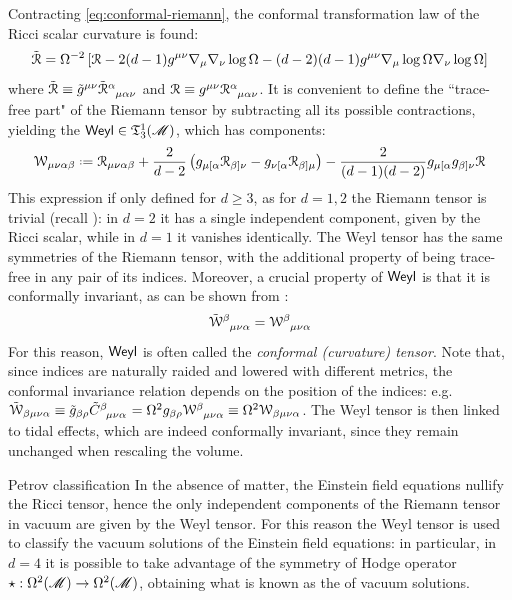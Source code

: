 Contracting \ref{eq:conformal-riemann}, the conformal transformation law of the Ricci scalar curvature is found:
\begin{equation}
  \tilde{\EuScript{R}} = \Omega^{-2} \left[ \EuScript{R} - 2 (d-1) g^{\mu \nu} \nabla_\mu \nabla_\nu \log \Omega - (d-2)(d-1) g^{\mu \nu} \nabla_\mu \log \Omega \nabla_\nu \log \Omega \right]
  \label{eq:conforma-ricci-scalar}
\end{equation}
where $ \tilde{\rr} \equiv \tilde{g}^{\mu \nu} \tensor{\tilde{\rr}}{^\alpha_{\mu \alpha \nu}} $ and $ \rr \equiv g^{\mu \nu} \tensor{\rr}{^\alpha_{\mu \alpha \nu}} $. It is convenient to define the ``trace-free part" of the Riemann tensor by subtracting all its possible contractions, yielding the  $ \textsf{Weyl} \in \mathfrak{T}^{1}_{3}(\mathscr{M}) $, which has components:
\begin{equation}
  \ww_{\mu \nu \alpha \beta} \defeq \rr_{\mu \nu \alpha \beta} + \frac{2}{d - 2} \left( g_{\mu [\alpha} \rr_{\beta] \nu} - g_{\nu [\alpha} \rr_{\beta] \mu} \right) - \frac{2}{(d-1)(d-2)} g_{\mu [\alpha} g_{\beta]\nu} \rr
\end{equation}
This expression if only defined for $ d \geq 3 $, as for $ d = 1,2 $ the Riemann tensor is trivial (recall ): in $ d = 2 $ it has a single independent component, given by the Ricci scalar, while in $ d = 1 $ it vanishes identically.
The Weyl tensor has the same symmetries  of the Riemann tensor, with the additional property of being trace-free in any pair of its indices. Moreover, a crucial property of $ \textsf{Weyl} $ is that it is conformally invariant, as can be shown from :
\begin{equation*}
  \tensor{\tilde{\ww}}{^\beta_{\mu \nu \alpha}} = \tensor{\ww}{^\beta_{\mu \nu \alpha}}
\end{equation*}
For this reason, $ \textsf{Weyl} $ is often called the \emph{conformal (curvature) tensor}. Note that, since indices are naturally raided and lowered with different metrics, the conformal invariance relation depends on the position of the indices: e.g. $ \tilde{\ww}_{\beta \mu \nu \alpha} \equiv \tilde{g}_{\beta \rho} \tensor{\tilde{C}}{^\beta_{\mu \nu \alpha}} = \Omega^2 g_{\beta \rho} \tensor{\ww}{^\beta_{\mu \nu \alpha}} \equiv \Omega^2 \ww_{\beta \mu \nu \alpha} $. The Weyl tensor is then linked to tidal effects, which are indeed conformally invariant, since they remain unchanged when rescaling the volume.

\begin{observation}{Petrov classification}{}
  In the absence of matter, the Einstein field equations nullify the Ricci tensor, hence the only independent components of the Riemann tensor in vacuum are given by the Weyl tensor. For this reason the Weyl tensor is used to classify the vacuum solutions of the Einstein field equations: in particular, in $ d = 4 $ it is possible to take advantage of the symmetry of Hodge operator $ \star : \Omega^{2}(\mathscr{M}) \rightarrow \Omega^{2}(\mathscr{M}) $, obtaining what is known as the  of vacuum solutions.
\end{observation}

